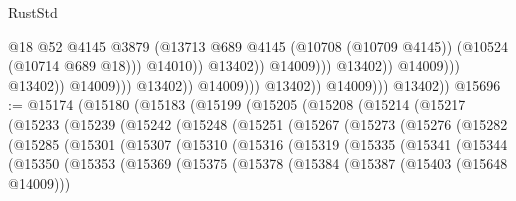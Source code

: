 \begin{lexlean}{RustStd}
\begin{coremodule}
                                                              @18
                                                              @52
                                                              @4145
                                                              @3879
                                                              (@13713
                                                                @689
                                                                @4145
                                                                (@10708 (@10709 @4145))
                                                                (@10524 (@10714 @689 @18)))
                                                              @14010))
                                                          @13402))
                                                      @14009)))
                                                @13402))
                                            @14009)))
                                      @13402))
                                  @14009)))
                            @13402))
                        @14009)))
                  @13402))
              @14009)))
        @13402))
@15696 := @15174
    (@15180
      (@15183
        (@15199
          (@15205
            (@15208
              (@15214
                (@15217
                  (@15233
                    (@15239
                      (@15242
                        (@15248
                          (@15251
                            (@15267
                              (@15273
                                (@15276
                                  (@15282
                                    (@15285
                                      (@15301
                                        (@15307
                                          (@15310
                                            (@15316
                                              (@15319
                                                (@15335
                                                  (@15341
                                                    (@15344
                                                      (@15350
                                                        (@15353
                                                          (@15369
                                                            (@15375
                                                              (@15378
                                                                (@15384
                                                                  (@15387 (@15403 (@15648 @14009)))

\end{coremodule}
\end{lexlean}
